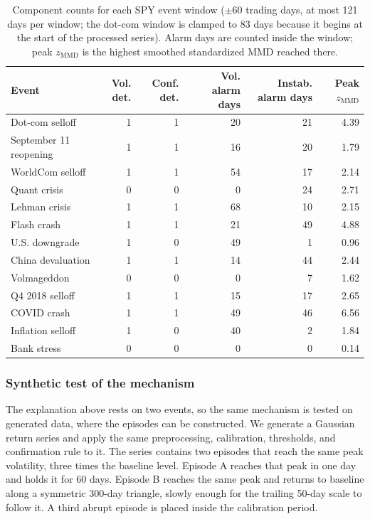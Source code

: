 \documentclass[pdflatex,sn-mathphys-num,iicol]{sn-jnl}
\begin{document}
\begin{table}[t]
\centering
\caption{Component counts for each SPY event window ($\pm60$ trading days, at most 121 days per window; the dot-com window is clamped to 83 days because it begins at the start of the processed series). Alarm days are counted inside the window; peak $z_{\mathrm{MMD}}$ is the highest smoothed standardized MMD reached there.}
\label{tab:mechanism}
\scriptsize
\begin{tabular}{lrrrrr}
\toprule
Event & Vol. det. & Conf. det. & Vol. alarm days & Instab. alarm days & Peak $z_{\mathrm{MMD}}$\\
\midrule
Dot-com selloff & 1 & 1 & 20 & 21 & 4.39\\
September 11 reopening & 1 & 1 & 16 & 20 & 1.79\\
WorldCom selloff & 1 & 1 & 54 & 17 & 2.14\\
Quant crisis & 0 & 0 & 0 & 24 & 2.71\\
Lehman crisis & 1 & 1 & 68 & 10 & 2.15\\
Flash crash & 1 & 1 & 21 & 49 & 4.88\\
U.S. downgrade & 1 & 0 & 49 & 1 & 0.96\\
China devaluation & 1 & 1 & 14 & 44 & 2.44\\
Volmageddon & 0 & 0 & 0 & 7 & 1.62\\
Q4 2018 selloff & 1 & 1 & 15 & 17 & 2.65\\
COVID crash & 1 & 1 & 49 & 46 & 6.56\\
Inflation selloff & 1 & 0 & 40 & 2 & 1.84\\
Bank stress & 0 & 0 & 0 & 0 & 0.14\\
\bottomrule
\end{tabular}
\end{table}

\subsubsection{Synthetic test of the mechanism}
\label{sec:mechtest}
The explanation above rests on two events, so the same mechanism is tested on generated data, where the episodes can be constructed. We generate a Gaussian return series and apply the same preprocessing, calibration, thresholds, and confirmation rule to it. The series contains two episodes that reach the same peak volatility, three times the baseline level. Episode A reaches that peak in one day and holds it for 60 days. Episode B reaches the same peak and returns to baseline along a symmetric 300-day triangle, slowly enough for the trailing 50-day scale to follow it. A third abrupt episode is placed inside the calibration period.
\end{document}

